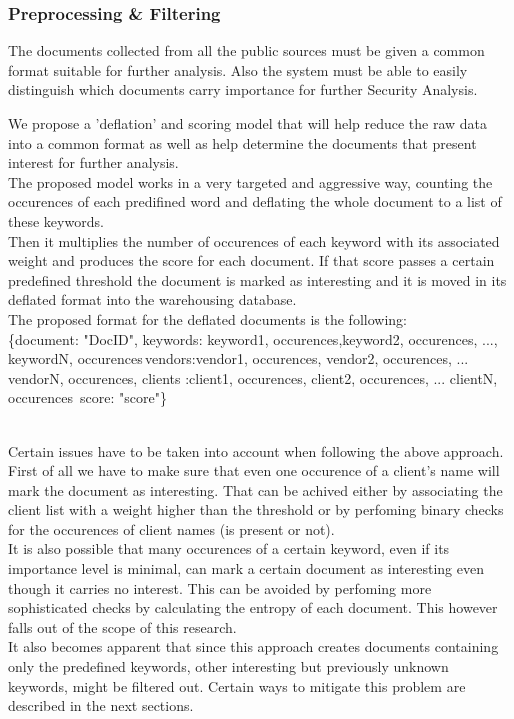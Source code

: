 \documentclass[12pt]{article}
\newcounter{subsubsubsection}[subsubsection]
\begin{document}
\subsubsection{Preprocessing \& Filtering}
The documents collected from all the public sources must be given a common format suitable for further analysis. Also the system must be able to easily distinguish which documents carry importance for further Security Analysis. 

We propose a 'deflation' and scoring model that will help reduce the raw data into a common format as well as help determine the documents that present interest for further analysis. 
\hfill \break\\
The proposed model works in a very targeted and aggressive way, counting the occurences of each predifined word and deflating the whole document to a list of these keywords. 
\hfill \break\\
Then it multiplies the number of occurences of each keyword with its associated weight and produces the score for each document. If that score passes a certain predefined threshold the document is marked as interesting and it is moved in its deflated format into the warehousing database. 
\hfill \break\\
The proposed format for the deflated documents is the following:\\

\{document: "DocID", keywords: \lbrack \lbrack keyword1, occurences\rbrack,\lbrack keyword2, occurences\rbrack, ..., \lbrack keywordN, occurences\rbrack \rbrack\,vendors:\lbrack\lbrack vendor1, occurences\rbrack, \lbrack vendor2, occurences\rbrack, ... \lbrack vendorN, occurences\rbrack  \rbrack, clients :\lbrack\lbrack client1, occurences\rbrack, \lbrack client2, occurences\rbrack, ... \lbrack clientN, occurences\rbrack  \rbrack\, score: "score"\}

\hfill \break\\
Certain issues have to be taken into account when following the above approach. First of all we have to make sure that even one occurence of a client's name will mark the document as interesting. That can be achived either by associating the client list with a weight higher than the threshold or by perfoming binary checks for the occurences of client names (is present or not). 
\hfill \break\\
It is also possible that many occurences of a certain keyword, even if its importance level is minimal, can mark a certain document as interesting even though it carries no interest. This can be avoided by perfoming more sophisticated checks by calculating the entropy of each document. This however falls out of the scope of this research.
\hfill \break\\
It also becomes apparent that since this approach creates documents containing only the predefined keywords, other interesting but previously unknown keywords, might be filtered out. Certain ways to mitigate this problem are described in the next sections. 
\end{document}
